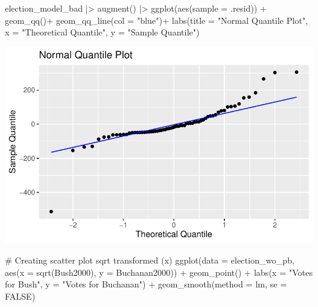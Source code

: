 \documentclass[
  letterpaper,
  DIV=11,
  numbers=noendperiod]{scrartcl}
\newenvironment{Shaded}{\begin{snugshade}}{\end{snugshade}}
\newcommand{\AttributeTok}[1]{\textcolor[rgb]{0.40,0.45,0.13}{#1}}
\newcommand{\CommentTok}[1]{\textcolor[rgb]{0.37,0.37,0.37}{#1}}
\newcommand{\ConstantTok}[1]{\textcolor[rgb]{0.56,0.35,0.01}{#1}}
\newcommand{\FunctionTok}[1]{\textcolor[rgb]{0.28,0.35,0.67}{#1}}
\newcommand{\NormalTok}[1]{\textcolor[rgb]{0.00,0.23,0.31}{#1}}
\newcommand{\SpecialCharTok}[1]{\textcolor[rgb]{0.37,0.37,0.37}{#1}}
\newcommand{\StringTok}[1]{\textcolor[rgb]{0.13,0.47,0.30}{#1}}
\begin{document}
\begin{Shaded}
\begin{Highlighting}[]
\NormalTok{election\_model\_bad }\SpecialCharTok{|\textgreater{}} \FunctionTok{augment}\NormalTok{() }\SpecialCharTok{|\textgreater{}} \FunctionTok{ggplot}\NormalTok{(}\FunctionTok{aes}\NormalTok{(}\AttributeTok{sample =}\NormalTok{ .resid)) }\SpecialCharTok{+}
  \FunctionTok{geom\_qq}\NormalTok{()}\SpecialCharTok{+} 
  \FunctionTok{geom\_qq\_line}\NormalTok{(}\AttributeTok{col =} \StringTok{"blue"}\NormalTok{)}\SpecialCharTok{+}
  \FunctionTok{labs}\NormalTok{(}\AttributeTok{title =} \StringTok{"Normal Quantile Plot"}\NormalTok{,}
       \AttributeTok{x =} \StringTok{"Theoretical Quantile"}\NormalTok{,}
       \AttributeTok{y =} \StringTok{"Sample Quantile"}\NormalTok{)}
\end{Highlighting}
\end{Shaded}

\includegraphics{case-study-template_files/figure-pdf/unnamed-chunk-6-3.pdf}

\begin{Shaded}
\begin{Highlighting}[]
\CommentTok{\# Creating scatter plot sqrt transformed (x)}
\FunctionTok{ggplot}\NormalTok{(}\AttributeTok{data =}\NormalTok{ election\_wo\_pb, }\FunctionTok{aes}\NormalTok{(}\AttributeTok{x =} \FunctionTok{sqrt}\NormalTok{(Bush2000), }\AttributeTok{y =}\NormalTok{ Buchanan2000)) }\SpecialCharTok{+}
  \FunctionTok{geom\_point}\NormalTok{() }\SpecialCharTok{+}
  \FunctionTok{labs}\NormalTok{(}\AttributeTok{x =} \StringTok{"Votes for Bush"}\NormalTok{, }\AttributeTok{y =} \StringTok{"Votes for Buchanan"}\NormalTok{) }\SpecialCharTok{+}
  \FunctionTok{geom\_smooth}\NormalTok{(}\AttributeTok{method =}\NormalTok{ lm, }\AttributeTok{se =} \ConstantTok{FALSE}\NormalTok{)}
\end{Highlighting}
\end{Shaded}
\end{document}
